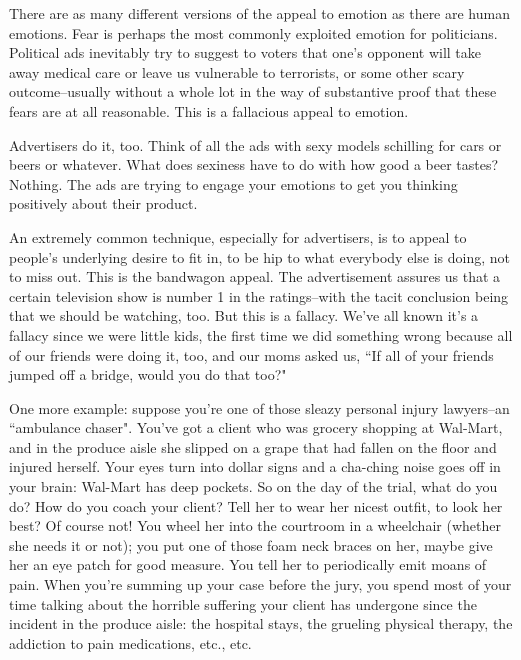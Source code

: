 There are as many different versions of the appeal to emotion as there are human emotions. Fear
is perhaps the most commonly exploited emotion for politicians. Political ads inevitably try to
suggest to voters that one's opponent will take away medical care or leave us vulnerable to
terrorists, or some other scary outcome--usually without a whole lot in the way of substantive
proof that these fears are at all reasonable. This is a fallacious appeal to emotion.

Advertisers do it, too. Think of all the ads with sexy models schilling for cars or beers or whatever.
What does sexiness have to do with how good a beer tastes? Nothing. The ads are trying to engage
your emotions to get you thinking positively about their product.

An extremely common technique, especially for advertisers, is to appeal to people's underlying
desire to fit in, to be hip to what everybody else is doing, not to miss out. This is the bandwagon
appeal. The advertisement assures us that a certain television show is number 1 in the ratings--with the
tacit conclusion being that we should be watching, too. But this is a fallacy. We've all known it's
a fallacy since we were little kids, the first time we did something wrong because all of our friends
were doing it, too, and our moms asked us, ``If all of your friends jumped off a bridge, would you
do that too?"

One more example: suppose you're one of those sleazy personal injury lawyers--an ``ambulance
chaser". You've got a client who was grocery shopping at Wal-Mart, and in the produce aisle she
slipped on a grape that had fallen on the floor and injured herself. Your eyes turn into dollar signs
and a cha-ching noise goes off in your brain: Wal-Mart has deep pockets. So on the day of the
trial, what do you do? How do you coach your client? Tell her to wear her nicest outfit, to look her
best? Of course not! You wheel her into the courtroom in a wheelchair (whether she needs it or
not); you put one of those foam neck braces on her, maybe give her an eye patch for good measure.
You tell her to periodically emit moans of pain. When you're summing up your case before the
jury, you spend most of your time talking about the horrible suffering your client has undergone
since the incident in the produce aisle: the hospital stays, the grueling physical therapy, the
addiction to pain medications, etc., etc.

